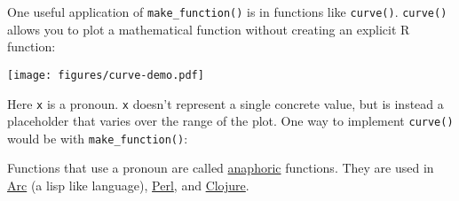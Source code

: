 One useful application of \texttt{make\_function()} is in functions like
\texttt{curve()}. \texttt{curve()} allows you to plot a mathematical
function without creating an explicit R function:

\begin{Shaded}
\begin{Highlighting}[]
\NormalTok{(}\NormalTok{(}\NormalTok{(} \NormalTok{*}\StringTok{ } \NormalTok{)}
\end{Highlighting}
\end{Shaded}

\texttt{[image: figures/curve-demo.pdf]}

Here \texttt{x} is a pronoun. \texttt{x} doesn't represent a single
concrete value, but is instead a placeholder that varies over the range
of the plot. One way to implement \texttt{curve()} would be with
\texttt{make\_function()}:

\begin{Shaded}
\begin{Highlighting}[]
\StringTok{ } \NormalTok{(}\NormalTok{, }\NormalTok{), } \NormalTok{, }
                    \NormalTok{()) \{}
  \StringTok{ }\NormalTok{(}\NormalTok{(} \NormalTok{), }

  \StringTok{ }\NormalTok{(xlim[}\NormalTok{], xlim[}\NormalTok{], } 
  \StringTok{ }

   \NormalTok{, } \NormalTok{(}
\NormalTok{\}}
\end{Highlighting}
\end{Shaded}

Functions that use a pronoun are called
\href{http://en.wikipedia.org/wiki/Anaphora_(linguistics)}{anaphoric}
functions. They are used in
\href{http://www.arcfn.com/doc/anaphoric.html}{Arc} (a lisp like
language),
\href{http://www.perlmonks.org/index.pl?node_id=666047}{Perl}, and
\href{http://amalloy.hubpages.com/hub/Unhygenic-anaphoric-Clojure-macros-for-fun-and-profit}{Clojure}.
 

